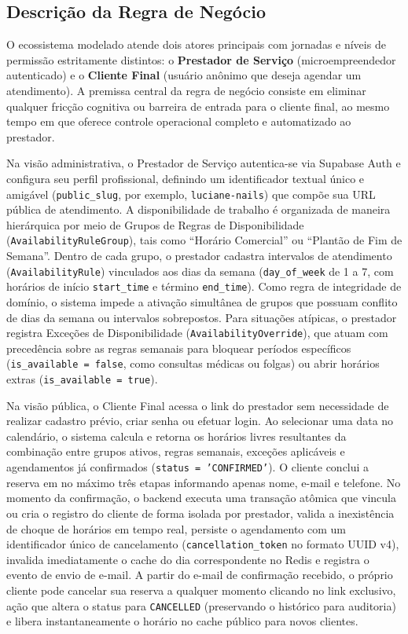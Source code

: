 \documentclass[12pt,a4paper]{article}
\begin{document}
\subsection{Descrição da Regra de Negócio}
\label{subsec:regra_negocio}

O ecossistema modelado atende dois atores principais com jornadas e níveis de permissão estritamente distintos: o \textbf{Prestador de Serviço} (microempreendedor autenticado) e o \textbf{Cliente Final} (usuário anônimo que deseja agendar um atendimento). A premissa central da regra de negócio consiste em eliminar qualquer fricção cognitiva ou barreira de entrada para o cliente final, ao mesmo tempo em que oferece controle operacional completo e automatizado ao prestador.

Na visão administrativa, o Prestador de Serviço autentica-se via Supabase Auth e configura seu perfil profissional, definindo um identificador textual único e amigável (\texttt{public\_slug}, por exemplo, \texttt{luciane-nails}) que compõe sua URL pública de atendimento. A disponibilidade de trabalho é organizada de maneira hierárquica por meio de Grupos de Regras de Disponibilidade (\texttt{AvailabilityRuleGroup}), tais como ``Horário Comercial'' ou ``Plantão de Fim de Semana''. Dentro de cada grupo, o prestador cadastra intervalos de atendimento (\texttt{AvailabilityRule}) vinculados aos dias da semana (\texttt{day\_of\_week} de 1 a 7, com horários de início \texttt{start\_time} e término \texttt{end\_time}). Como regra de integridade de domínio, o sistema impede a ativação simultânea de grupos que possuam conflito de dias da semana ou intervalos sobrepostos. Para situações atípicas, o prestador registra Exceções de Disponibilidade (\texttt{AvailabilityOverride}), que atuam com precedência sobre as regras semanais para bloquear períodos específicos (\texttt{is\_available = false}, como consultas médicas ou folgas) ou abrir horários extras (\texttt{is\_available = true}).

Na visão pública, o Cliente Final acessa o link do prestador sem necessidade de realizar cadastro prévio, criar senha ou efetuar login. Ao selecionar uma data no calendário, o sistema calcula e retorna os horários livres resultantes da combinação entre grupos ativos, regras semanais, exceções aplicáveis e agendamentos já confirmados (\texttt{status = 'CONFIRMED'}). O cliente conclui a reserva em no máximo três etapas informando apenas nome, e-mail e telefone. No momento da confirmação, o backend executa uma transação atômica que vincula ou cria o registro do cliente de forma isolada por prestador, valida a inexistência de choque de horários em tempo real, persiste o agendamento com um identificador único de cancelamento (\texttt{cancellation\_token} no formato UUID v4), invalida imediatamente o cache do dia correspondente no Redis e registra o evento de envio de e-mail. A partir do e-mail de confirmação recebido, o próprio cliente pode cancelar sua reserva a qualquer momento clicando no link exclusivo, ação que altera o status para \texttt{CANCELLED} (preservando o histórico para auditoria) e libera instantaneamente o horário no cache público para novos clientes.
\end{document}
